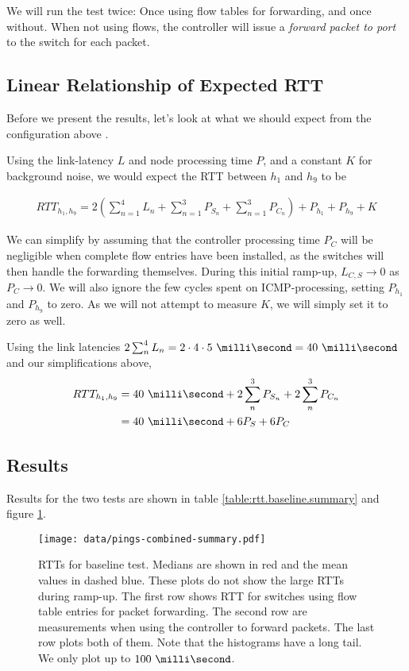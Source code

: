 We will run the test twice: Once using flow tables for forwarding, and once
without.  When not using flows, the controller will issue a \textit{forward
packet to port} to the switch for each packet.

\subsection{Linear Relationship of Expected \acs{RTT}}

Before we present the results, let's look at what we should expect from the
configuration above \cite{DBLP:conf/cnsm/PhemiusB13}.

Using the link-latency $L$ and node
processing time $P$, and a constant $K$ for
background noise, we would expect the \acf{RTT}
between $h_1$ and $h_9$ to be

\begin{gather}
  RTT_{h_1, h_9} = 2\left( \sum_{n=1}^4 L_n + \sum_{n=1}^3 P_{S_n} +
      \sum_{n=1}^3 P_{C_n} \right) + P_{h_1} + P_{h_9} + K
  \label{equation:baseline.rtt}
\end{gather}

We can simplify by assuming that the controller processing time $P_C$ will
be negligible when complete flow entries have been installed, as the
switches will then handle the forwarding themselves.  During this initial
ramp-up, $L_{C,S} \to 0$ as $P_C \to 0$.  We will also ignore the few
cycles spent on ICMP-processing, setting $P_{h_1}$ and $P_{h_9}$ to zero.
As we will not attempt to measure $K$, we will simply set it to zero as
well.

Using the link latencies $2\sum_n^4 L_n = 2\cdot4\cdot\ms{5} = \ms{40}$
and our simplifications above,
\begin{align}
  RTT_{h_1,h_9} &= \ms{40} + 2\sum_n^3 P_{S_n} + 2\sum_n^3 P_{C_n} \\
                &= \ms{40} + 6P_S + 6P_C
  \label{equation:expected.baseline.rtt}
\end{align}

\subsection{Results}

Results for the two tests are shown in table
\ref{table:rtt.baseline.summary} and figure
\ref{figure:baseline.combined.summary.plot}.

\begin{figure}
  \centering
  \texttt{[image: data/pings-combined-summary.pdf]}
  \caption{\acs{RTT}s for baseline test.  Medians are shown in red and the
    mean values in dashed blue.
    These plots do not show the large \acs{RTT}s during ramp-up.
    The first row shows \acs{RTT} for switches using flow table entries for
    packet forwarding.  The second row are measurements when using the
    controller to forward packets.  The last row plots both of them.
    Note that the histograms have a long tail. We only plot up to $\ms{100}$.}
  \label{figure:baseline.combined.summary.plot}
\end{figure}

